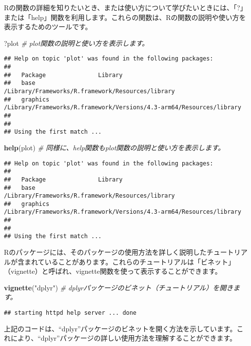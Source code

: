 \documentclass[
]{article}
\newenvironment{Shaded}{\begin{snugshade}}{\end{snugshade}}
\newcommand{\CommentTok}[1]{\textcolor[rgb]{0.56,0.35,0.01}{\textit{#1}}}
\newcommand{\FunctionTok}[1]{\textcolor[rgb]{0.13,0.29,0.53}{\textbf{#1}}}
\newcommand{\NormalTok}[1]{#1}
\newcommand{\StringTok}[1]{\textcolor[rgb]{0.31,0.60,0.02}{#1}}
\begin{document}
Rの関数の詳細を知りたいとき、または使い方について学びたいときには、「?」または「help」関数を利用します。これらの関数は、Rの関数の説明や使い方を表示するためのツールです。

\begin{Shaded}
\begin{Highlighting}[]
\NormalTok{?plot  }\CommentTok{\# \textquotesingle{}plot\textquotesingle{}関数の説明と使い方を表示します。}
\end{Highlighting}
\end{Shaded}

\begin{verbatim}
## Help on topic 'plot' was found in the following packages:
## 
##   Package               Library
##   base                  /Library/Frameworks/R.framework/Resources/library
##   graphics              /Library/Frameworks/R.framework/Versions/4.3-arm64/Resources/library
## 
## 
## Using the first match ...
\end{verbatim}

\begin{Shaded}
\begin{Highlighting}[]
\FunctionTok{help}\NormalTok{(plot)  }\CommentTok{\# 同様に、\textquotesingle{}help\textquotesingle{}関数も\textquotesingle{}plot\textquotesingle{}関数の説明と使い方を表示します。}
\end{Highlighting}
\end{Shaded}

\begin{verbatim}
## Help on topic 'plot' was found in the following packages:
## 
##   Package               Library
##   base                  /Library/Frameworks/R.framework/Resources/library
##   graphics              /Library/Frameworks/R.framework/Versions/4.3-arm64/Resources/library
## 
## 
## Using the first match ...
\end{verbatim}

Rのパッケージには、そのパッケージの使用方法を詳しく説明したチュートリアルが含まれていることがあります。これらのチュートリアルは「ビネット」（vignette）と呼ばれ、vignette関数を使って表示することができます。

\begin{Shaded}
\begin{Highlighting}[]
\FunctionTok{vignette}\NormalTok{(}\StringTok{"dplyr"}\NormalTok{)  }\CommentTok{\# \textquotesingle{}dplyr\textquotesingle{}パッケージのビネット（チュートリアル）を開きます。}
\end{Highlighting}
\end{Shaded}

\begin{verbatim}
## starting httpd help server ... done
\end{verbatim}

上記のコードは、``dplyr''パッケージのビネットを開く方法を示しています。これにより、``dplyr''パッケージの詳しい使用方法を理解することができます。
\end{document}

